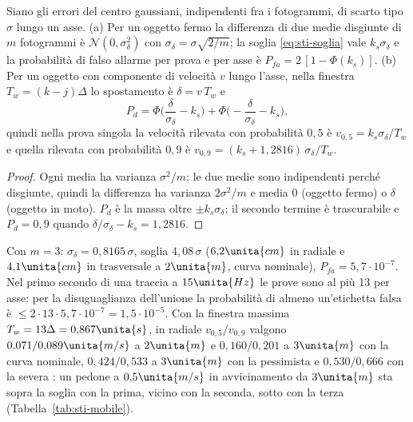 \begin{proposizione}\label{prop:sti-mobile}
Siano gli errori del centro gaussiani, indipendenti fra i fotogrammi, di scarto tipo $\sigma$ lungo un asse. (a) Per un oggetto fermo la differenza di due medie disgiunte di $m$ fotogrammi è $\mathcal N(0,\sigma_\delta^2)$ con $\sigma_\delta=\sigma\sqrt{2/m}$; la soglia \eqref{eq:sti-soglia} vale $k_s\sigma_\delta$ e la probabilità di falso allarme per prova e per asse è $P_{fa}=2\,[1-\Phi(k_s)]$. (b) Per un oggetto con componente di velocità $v$ lungo l'asse, nella finestra $T_w=(k-j)\Delta$ lo spostamento è $\delta=v\,T_w$ e
\[P_d=\Phi\!\Big(\frac{\delta}{\sigma_\delta}-k_s\Big)+\Phi\!\Big(-\frac{\delta}{\sigma_\delta}-k_s\Big),\]
quindi nella prova singola la velocità rilevata con probabilità $0{,}5$ è $v_{0,5}=k_s\sigma_\delta/T_w$ e quella rilevata con probabilità $0{,}9$ è $v_{0,9}=(k_s+1{,}2816)\,\sigma_\delta/T_w$. 
\end{proposizione}
\begin{proof}
Ogni media ha varianza $\sigma^2/m$; le due medie sono indipendenti perché disgiunte, quindi la differenza ha varianza $2\sigma^2/m$ e media $0$ (oggetto fermo) o $\delta$ (oggetto in moto). $P_d$ è la massa oltre $\pm k_s\sigma_\delta$; il secondo termine è trascurabile e $P_d=0{,}9$ quando $\delta/\sigma_\delta-k_s=1{,}2816$.
\end{proof}
Con $m=3$: $\sigma_\delta=0{,}8165\,\sigma$, soglia $4{,}08\,\sigma$ ($6{,}2\unita{cm}$ in radiale e $4{,}1\unita{cm}$ in trasversale a $2\unita{m}$, curva nominale), $P_{fa}=5{,}7\cdot10^{-7}$. Nel primo secondo di una traccia a $15\unita{Hz}$ le prove sono al più 13 per asse: per la disuguaglianza dell'unione la probabilità di almeno un'etichetta falsa è $\le2\cdot13\cdot5{,}7\cdot10^{-7}=1{,}5\cdot10^{-5}$. Con la finestra massima $T_w=13\Delta=0{,}867\unita{s}$, in radiale $v_{0,5}/v_{0,9}$ valgono $0{,}071/0{,}089\unita{m/s}$ a $2\unita{m}$ e $0{,}160/0{,}201$ a $3\unita{m}$ con la curva nominale, $0{,}424/0{,}533$ a $3\unita{m}$ con la pessimista e $0{,}530/0{,}666$ con la severa : un pedone a $0{,}5\unita{m/s}$ in avvicinamento da $3\unita{m}$ sta sopra la soglia con la prima, vicino con la seconda, sotto con la terza (Tabella~\ref{tab:sti-mobile}).

